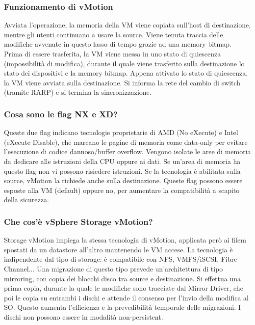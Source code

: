 \documentclass[11pt]{article}
\begin{document}
\subsubsection{Funzionamento di vMotion}
Avviata l'operazione, la memoria della VM viene copiata sull'host di destinazione, mentre gli utenti continuano a usare la source. Viene tenuta traccia delle modifiche avvenute in questo lasso di tempo grazie ad una memory bitmap. Prima di essere trasferita, la VM viene messa in uno stato di quiescenza (impossibilità di modifica), durante il quale viene trasferito sulla destinazione lo stato dei dispositivi e la memory bitmap. Appena attivato lo stato di quiescenza, la VM viene avviata sulla destinazione. Si informa la rete del cambio di switch (tramite RARP) e si termina la sincronizzazione.

\subsubsection{Cosa sono le flag NX e XD?}
Queste due flag indicano tecnologie proprietarie di AMD (No eXecute) e Intel (eXecute Disable), che marcano le pagine di memoria come data-only per evitare l'esecuzione di codice dannoso/buffer overflow. Vengono isolate le aree di memoria da dedicare alle istruzioni della CPU oppure ai dati. Se un'area di memoria ha questo flag non vi possono risiedere istruzioni. Se la tecnologia è abilitata sulla source, vMotion la richiede anche sulla destinazione. Queste flag possono essere esposte alla VM (default) oppure no, per aumentare la compatibilità a scapito della sicurezza. 

\subsubsection{Che cos'è vSphere Storage vMotion?}
Storage vMotion impiega la stessa tecnologia di vMotion, applicata però ai filem spostati da un datastore all'altro mantenendo le VM accese. La tecnologia è indipendente dal tipo di storage: è compatibile con NFS, VMFS/iSCSI, Fibre Channel... Una migrazione di questo tipo prevede un'architettura di tipo mirroring, con copia dei blocchi disco tra source e destinazione. Si effettua una prima copia, durante la quale le modifiche sono tracciate dal Mirror Driver, che poi le copia su entrambi i dischi e attende il consenso per l'invio della modifica al SO. Questo aumenta l'efficienza e la prevedibilità temporale delle migrazioni. I dischi non possono essere in modalità non-persistent. 
\end{document}

